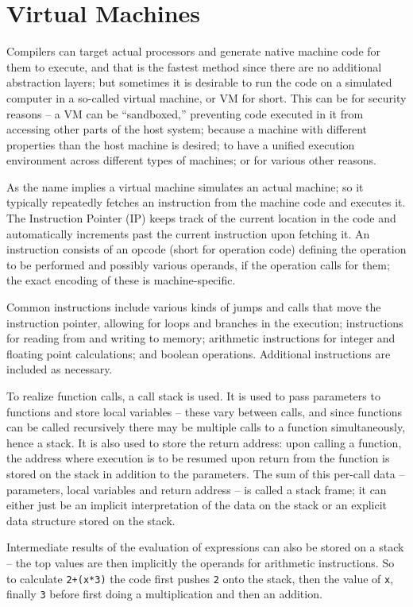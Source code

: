 	\section{Virtual Machines}
	
		Compilers can target actual processors and generate native machine code for them to execute, and that is the fastest method since there are no additional abstraction layers; but sometimes it is desirable to run the code on a simulated computer in a so-called virtual machine, or VM for short. This can be for security reasons -- a VM can be ``sandboxed,'' preventing code executed in it from accessing other parts of the host system; because a machine with different properties than the host machine is desired; to have a unified execution environment across different types of machines; or for various other reasons.
		
		As the name implies a virtual machine simulates an actual machine; so it typically repeatedly fetches an instruction from the machine code and executes it. The Instruction Pointer (IP) keeps track of the current location in the code and automatically increments past the current instruction upon fetching it. An instruction consists of an opcode (short for operation code) defining the operation to be performed and possibly various operands, if the operation calls for them; the exact encoding of these is machine-specific.
		
		Common instructions include various kinds of jumps and calls that move the instruction pointer, allowing for loops and branches in the execution; instructions for reading from and writing to memory; arithmetic instructions for integer and floating point calculations; and boolean operations. Additional instructions are included as necessary.
		
		To realize function calls, a call stack is used. It is used to pass parameters to functions and store local variables -- these vary between calls, and since functions can be called recursively there may be multiple calls to a function simultaneously, hence a stack. It is also used to store the return address: upon calling a function, the address where execution is to be resumed upon return from the function is stored on the stack in addition to the parameters. The sum of this per-call data -- parameters, local variables and return address -- is called a stack frame; it can either just be an implicit interpretation of the data on the stack or an explicit data structure stored on the stack.
		
		Intermediate results of the evaluation of expressions can also be stored on a stack -- the top values are then implicitly the operands for arithmetic instructions. So to calculate \lstinline$2+(x*3)$ the code first pushes \lstinline$2$ onto the stack, then the value of \lstinline$x$, finally \lstinline$3$ before first doing a multiplication and then an addition.
		
